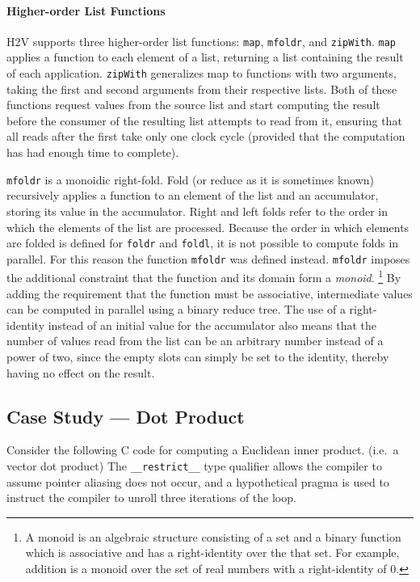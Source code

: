 \documentclass[english,onecolumn]{scrartcl}
\begin{document}
\paragraph{Higher-order List Functions}
\label{sec:listFuncs}
H2V supports three higher-order list functions: \texttt{map}, \texttt{mfoldr}, and \texttt{zipWith}.
\texttt{map} applies a function to each element of a list, returning a list containing the result of each application.
\texttt{zipWith} generalizes map to functions with two arguments, taking the first and second arguments from their respective
lists. Both of these functions request values from the source list and start computing the result before the consumer of the
resulting list attempts to read from it, ensuring that all reads after the first take only one clock cycle (provided that the
computation has had enough time to complete).

\texttt{mfoldr} is a monoidic right-fold. Fold (or reduce as it is sometimes known) recursively applies a function to an element
of the list and an accumulator, storing its value in the accumulator. Right and left folds refer to the order in which the
elements of the list are processed. Because the order in which elements are folded is defined for \texttt{foldr} and
\texttt{foldl}, it is not possible to compute folds in parallel. For this reason the function \texttt{mfoldr} was defined instead.
\texttt{mfoldr} imposes the additional constraint that the function and its domain form a \textit{monoid}.%
\footnote{A monoid is an algebraic structure consisting of a set and a binary function which is associative and has a
    right-identity over the that set. For example, addition is a monoid over the set of real numbers with a right-identity of 0.}
By adding the requirement that the function must be associative, intermediate values can be computed in parallel using a binary
reduce tree. The use of a right-identity instead of an initial value for the accumulator also means that the number of values read
from the list can be an arbitrary number instead of a power of two, since the empty slots can simply be set to the identity,
thereby having no effect on the result.



\subsection{Case Study --- Dot Product}
\label{sec:imp_vs_func}
Consider the following C code for computing a Euclidean inner product. (i.e.\ a vector dot product)
The \texttt{\_\_restrict\_\_} type qualifier allows the compiler to assume pointer aliasing does not occur,\cite[122]{c_std}
and a hypothetical pragma is used to instruct the compiler to unroll three iterations of the loop.
\end{document}
